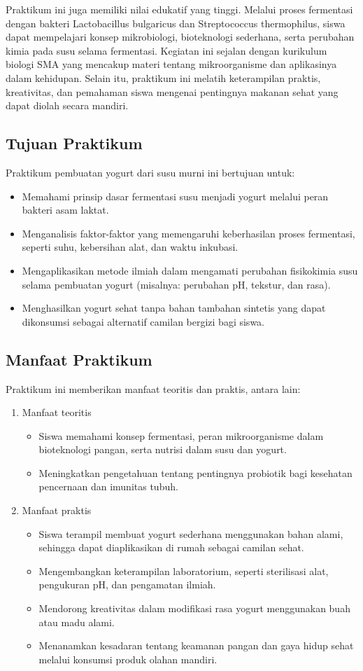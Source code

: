 \documentclass[a4paper,12pt, left=3cm,right=2cm,bottom=2cm, bahasa]{article}
\begin{document}
Praktikum ini juga memiliki nilai edukatif yang tinggi. Melalui proses fermentasi dengan bakteri Lactobacillus bulgaricus dan Streptococcus thermophilus, siswa dapat mempelajari konsep mikrobiologi, bioteknologi sederhana, serta perubahan kimia pada susu selama fermentasi. Kegiatan ini sejalan dengan kurikulum biologi SMA yang mencakup materi tentang mikroorganisme dan aplikasinya dalam kehidupan. Selain itu, praktikum ini melatih keterampilan praktis, kreativitas, dan pemahaman siswa mengenai pentingnya makanan sehat yang dapat diolah secara mandiri.
\subsection{Tujuan Praktikum}
Praktikum pembuatan yogurt dari susu murni ini bertujuan untuk:
\begin{itemize}
  \item Memahami prinsip dasar fermentasi susu menjadi yogurt melalui peran bakteri asam laktat.
  \item Menganalisis faktor-faktor yang memengaruhi keberhasilan proses fermentasi, seperti suhu, kebersihan alat, dan waktu inkubasi.
  \item Mengaplikasikan metode ilmiah dalam mengamati perubahan fisikokimia susu selama pembuatan yogurt (misalnya: perubahan pH, tekstur, dan rasa).
  \item Menghasilkan yogurt sehat tanpa bahan tambahan sintetis yang dapat dikonsumsi sebagai alternatif camilan bergizi bagi siswa.
\end{itemize}
\subsection{Manfaat Praktikum}
Praktikum ini memberikan manfaat teoritis dan praktis, antara lain:
\begin{enumerate}
  \item Manfaat teoritis
    \begin{itemize}
    \item Siswa memahami konsep fermentasi, peran mikroorganisme dalam bioteknologi pangan, serta nutrisi dalam susu dan yogurt.
    \item Meningkatkan pengetahuan tentang pentingnya probiotik bagi kesehatan pencernaan dan imunitas tubuh.
    \end{itemize}
  \item Manfaat praktis
    \begin{itemize}
   \item Siswa terampil membuat yogurt sederhana menggunakan bahan alami, sehingga dapat diaplikasikan di rumah sebagai camilan sehat.
   \item Mengembangkan keterampilan laboratorium, seperti sterilisasi alat, pengukuran pH, dan pengamatan ilmiah.
   \item Mendorong kreativitas dalam modifikasi rasa yogurt menggunakan buah atau madu alami.
   \item Menanamkan kesadaran tentang keamanan pangan dan gaya hidup sehat melalui konsumsi produk olahan mandiri.
    \end{itemize}
\end{enumerate}
\pagebreak
\setcounter{subsection}{0}
\setcounter{section}{2}
\end{document}
